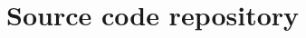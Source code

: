 \chapter{Source code repository}
\label{sec:source-code-repository}
\thispagestyle{fancy}

\lipsum[4]

\clearemptydoublepage